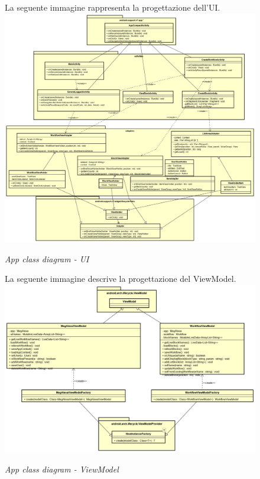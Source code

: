 \begin{figure} [H]
La seguente immagine rappresenta la progettazione dell'UI.
	\centering
	\includegraphics[scale=0.3]{./images/UI.png}
	\caption{\textit{App class diagram - UI}}\label{UI}
\end{figure}


\begin{figure} [H]
La seguente immagine descrive la progettazione del ViewModel.
	\centering
	\includegraphics[scale=0.3]{./images/ViewModel.png}
	\caption{\textit{App class diagram - ViewModel}}\label{ViewModel}
\end{figure}


